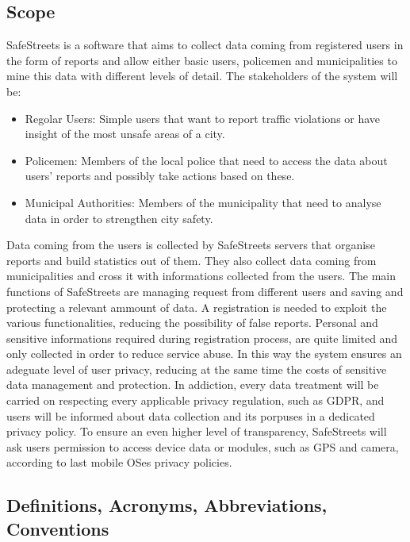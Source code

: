 \subsection{Scope}
SafeStreets is a software that aims to collect data coming from registered users in the form of reports and allow either basic users, policemen and municipalities to mine this data with different levels of detail.
The stakeholders of the system will be:
\begin{itemize}
	\item Regolar Users: Simple users that want to report traffic violations or have insight of the most unsafe areas of a city.
	\item Policemen: Members of the local police that need to access the data about users' reports and possibly take actions based on these. 
	\item Municipal Authorities: Members of the municipality that need to analyse data in order to strengthen city safety.
\end{itemize}
Data coming from the users is collected by SafeStreets servers that organise reports and build statistics out of them.
They also collect data coming from municipalities and cross it with informations collected from the users.
The main functions of SafeStreets are managing request from different users and saving and protecting a relevant ammount of data.\newline
A registration is needed to exploit the various functionalities, reducing the possibility of false reports. Personal and sensitive informations required during registration process, are quite limited and only collected in order to reduce service abuse. In this way the system ensures an adeguate level of user privacy, reducing at the same time the costs of sensitive data management and protection.\newline
In addiction, every data treatment will be carried on respecting every applicable privacy regulation, such as GDPR, and users will be informed about data collection and its porpuses in a dedicated privacy policy.\newline
To ensure an even higher level of transparency, SafeStreets will ask users permission to access device data or modules, such as GPS and camera, according to last mobile OSes privacy policies.

\subsection{Definitions, Acronyms, Abbreviations, Conventions}
